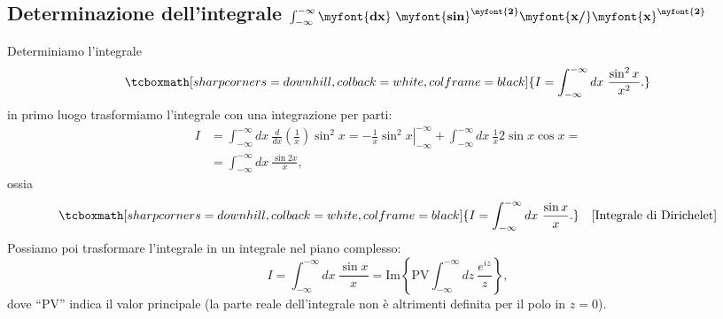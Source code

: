 \subsection{Determinazione dell'integrale $\int _{-\infty} ^{-\infty} \myfont{\textbf{dx}}\ \myfont{\textbf{sin}} ^{\myfont{\textbf{2}}} \myfont{\textbf{x/}}\myfont{\textbf{x}}^{\myfont{\textbf{2}}}$}
Determiniamo l'integrale
	\begin{equation}
		\tcboxmath[sharp corners=downhill, colback=white, colframe=black]{
			I= \int _{-\infty} ^{-\infty} dx\ \frac{\sin ^2 x}{x^2}.
			}
	\end{equation}
in primo luogo trasformiamo l'integrale con una integrazione per parti:
	\begin{align}
		I &= \int _{-\infty} ^{-\infty} dx\ \frac{d}{dx}\left(\frac{1}{x}\right)\sin ^2 x =  \left. -\frac{1}{x}\sin ^2 x\right\vert _{-\infty} ^{-\infty} +\int _{-\infty} ^{-\infty} dx\ \frac{1}{x} 2 \sin x \cos x  =\nonumber \\
		&= \int _{-\infty} ^{-\infty} dx\ \frac{\sin 2 x}{x}, 
	\end{align}
ossia
	\begin{equation}
		\tcboxmath[sharp corners=downhill, colback=white, colframe=black]{
		I= \int _{-\infty} ^{-\infty} dx\ \frac{\sin  x}{x}.
		} \quad \textrm{[Integrale di Dirichelet]}
	\end{equation}
Possiamo poi trasformare l'integrale in un integrale nel piano complesso:
	\begin{equation}
		I= \int _{-\infty} ^{-\infty} dx\ \frac{\sin  x}{x}= \textrm{Im}\left\{\textrm{PV} \int _{-\infty} ^{-\infty} dz\ \frac{e^{iz}}{z}\right\},
	\label{eq:cap15_14}
	\end{equation}
dove ``PV'' indica il valor principale (la parte reale dell'integrale non è altrimenti definita per il polo in $z=0$). \newpage

